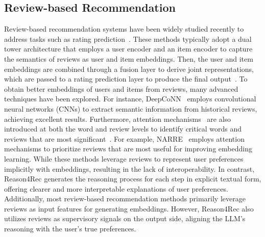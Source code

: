 \subsection{Review-based Recommendation}
Review-based recommendation systems have been widely studied recently to address tasks such as rating prediction~\cite{rating_predict1, rating_predict2,rating_predict3,rating_prediction4,rating_prediction5}. 
These methods typically adopt a dual tower architecture that employs a user encoder and an item encoder to capture the semantics of reviews as user and item embeddings. 
Then, the user and item embeddings are combined through a fusion layer to derive joint representations, which are passed to a rating prediction layer to produce the final output~\cite{ReviewRecSurvey}.
To obtain better embeddings of users and items from reviews, many advanced techniques have been explored. 
For instance, DeepCoNN~\cite{deepconn} employs convolutional neural networks (CNNs) to extract semantic information from historical reviews, achieving excellent results. Furthermore, attention mechanisms~\cite{attention} are also introduced at both the word and review levels to identify critical words and reviews that are most significant~\cite{liu2019nrpa,attentionRec2,attention3}. 
For example, NARRE~\cite{NARRE} employs attention mechanisms to prioritize reviews that are most useful for improving embedding learning.
While these methods leverage reviews to represent user preferences implicitly with embeddings, resulting in the lack of interoperability. 
In contrast, Reason4Rec generates the reasoning process for each step in explicit textual form, offering clearer and more interpretable explanations of user preferences. 
Additionally, most review-based recommendation methods primarily leverage reviews as input features for generating embeddings. However, Reason4Rec also utilizes reviews as supervisory signals on the output side, aligning the LLM’s reasoning with the user's true preferences.

